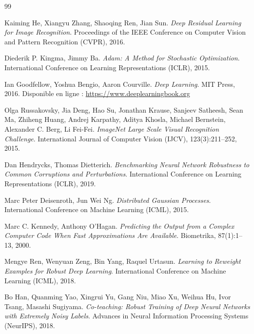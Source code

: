 \documentclass[11pt,a4paper,openany]{book}
\begin{document}
\begin{thebibliography}{99}

Kaiming He, Xiangyu Zhang, Shaoqing Ren, Jian Sun.
\textit{Deep Residual Learning for Image Recognition}.
Proceedings of the IEEE Conference on Computer Vision and Pattern Recognition (CVPR), 2016.

Diederik P. Kingma, Jimmy Ba.
\textit{Adam: A Method for Stochastic Optimization}.
International Conference on Learning Representations (ICLR), 2015.

Ian Goodfellow, Yoshua Bengio, Aaron Courville.
\textit{Deep Learning}.
MIT Press, 2016.
Disponible en ligne : \url{https://www.deeplearningbook.org}

Olga Russakovsky, Jia Deng, Hao Su, Jonathan Krause, Sanjeev Satheesh, Sean Ma,
Zhiheng Huang, Andrej Karpathy, Aditya Khosla, Michael Bernstein, Alexander C. Berg, Li Fei-Fei.
\textit{ImageNet Large Scale Visual Recognition Challenge}.
International Journal of Computer Vision (IJCV), 123(3):211--252, 2015.

Dan Hendrycks, Thomas Dietterich.
\textit{Benchmarking Neural Network Robustness to Common Corruptions and Perturbations}.
International Conference on Learning Representations (ICLR), 2019.

Marc Peter Deisenroth, Jun Wei Ng.
\textit{Distributed Gaussian Processes}.
International Conference on Machine Learning (ICML), 2015.

Marc C. Kennedy, Anthony O'Hagan.
\textit{Predicting the Output from a Complex Computer Code When Fast Approximations Are Available}.
Biometrika, 87(1):1--13, 2000.

Mengye Ren, Wenyuan Zeng, Bin Yang, Raquel Urtasun.
\textit{Learning to Reweight Examples for Robust Deep Learning}.
International Conference on Machine Learning (ICML), 2018.

Bo Han, Quanming Yao, Xingrui Yu, Gang Niu, Miao Xu, Weihua Hu, Ivor Tsang, Masashi Sugiyama.
\textit{Co-teaching: Robust Training of Deep Neural Networks with Extremely Noisy Labels}.
Advances in Neural Information Processing Systems (NeurIPS), 2018.


\end{thebibliography}
\end{document}
